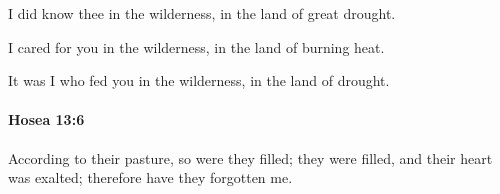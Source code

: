 			\begin{versebox}
					\item[BHS] 
					\item[LXX] 
					\item[ASV] I did know thee in the wilderness, in the land of great drought.
					\item[NIV] I cared for you in the wilderness, in the land of burning heat.
					\item[NRSV] It was I who fed you in the wilderness, in the land of drought.
			\end{versebox}

		\paragraph{Hosea 13:6} %
			\label{HOSEA-13-6}

			According to their pasture, so were they filled; they were filled, and their heart was exalted; therefore have they forgotten me.

